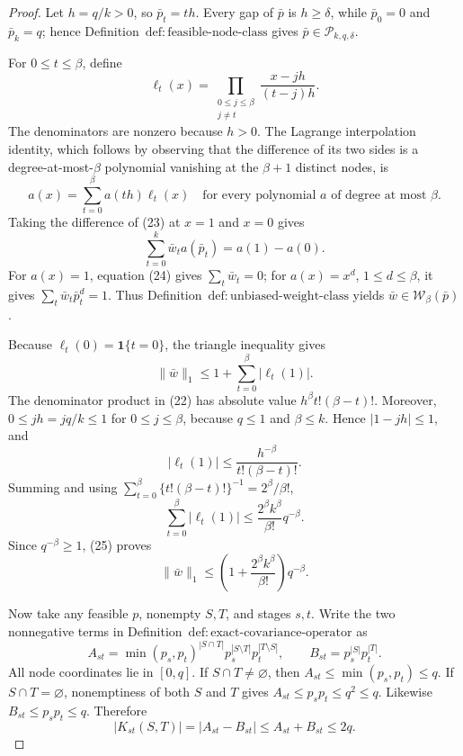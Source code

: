 \documentclass{article}
\begin{document}
\begin{proof}
Let \(h=q/k>0\), so \(\bar p_t=th\).  Every gap of \(\bar p\) is \(h\ge\delta\), while \(\bar p_0=0\) and \(\bar p_k=q\); hence Definition~\(\mathrm{def{:}feasible\text{-}node\text{-}class}\) gives \(\bar p\in\mathcal P_{k,q,\delta}\).

For \(0\le t\le\beta\), define
\[
\ell_t(x)=\prod_{\substack{0\le j\le\beta\\j\ne t}}
\frac{x-jh}{(t-j)h}.
\tag{22}
\]
The denominators are nonzero because \(h>0\).  The Lagrange interpolation identity, which follows by observing that the difference of its two sides is a degree-at-most-\(\beta\) polynomial vanishing at the \(\beta+1\) distinct nodes, is
\[
a(x)=\sum_{t=0}^\beta a(th)\ell_t(x)
\quad\text{for every polynomial \(a\) of degree at most \(\beta\)}.
\tag{23}
\]
Taking the difference of (23) at \(x=1\) and \(x=0\) gives
\[
\sum_{t=0}^k\bar w_ta(\bar p_t)=a(1)-a(0).
\tag{24}
\]
For \(a(x)=1\), equation (24) gives \(\sum_t\bar w_t=0\); for \(a(x)=x^d\), \(1\le d\le\beta\), it gives \(\sum_t\bar w_t\bar p_t^d=1\).  Thus Definition~\(\mathrm{def{:}unbiased\text{-}weight\text{-}class}\) yields \(\bar w\in\mathcal W_\beta(\bar p)\).

Because \(\ell_t(0)=\mathbf 1\{t=0\}\), the triangle inequality gives
\[
\|\bar w\|_1
\le1+\sum_{t=0}^\beta|\ell_t(1)|.
\tag{25}
\]
The denominator product in (22) has absolute value \(h^\beta t!(\beta-t)!\).  Moreover, \(0\le jh=jq/k\le1\) for \(0\le j\le\beta\), because \(q\le1\) and \(\beta\le k\).  Hence \(|1-jh|\le1\), and
\[
|\ell_t(1)|
\le\frac{h^{-\beta}}{t!(\beta-t)!}.
\]
Summing and using \(\sum_{t=0}^\beta\{t!(\beta-t)!\}^{-1}=2^\beta/\beta!\),
\[
\sum_{t=0}^\beta|\ell_t(1)|
\le\frac{2^\beta k^\beta}{\beta!}q^{-\beta}.
\]
Since \(q^{-\beta}\ge1\), (25) proves
\[
\|\bar w\|_1
\le\left(1+\frac{2^\beta k^\beta}{\beta!}\right)q^{-\beta}.
\tag{26}
\]

Now take any feasible \(p\), nonempty \(S,T\), and stages \(s,t\).  Write the two nonnegative terms in Definition~\(\mathrm{def{:}exact\text{-}covariance\text{-}operator}\) as
\[
A_{st}=\min(p_s,p_t)^{|S\cap T|}p_s^{|S\setminus T|}p_t^{|T\setminus S|},
\qquad
B_{st}=p_s^{|S|}p_t^{|T|}.
\]
All node coordinates lie in \([0,q]\).  If \(S\cap T\ne\varnothing\), then \(A_{st}\le\min(p_s,p_t)\le q\).  If \(S\cap T=\varnothing\), nonemptiness of both \(S\) and \(T\) gives \(A_{st}\le p_sp_t\le q^2\le q\).  Likewise \(B_{st}\le p_sp_t\le q\).  Therefore
\[
|K_{st}(S,T)|=|A_{st}-B_{st}|
\le A_{st}+B_{st}\le2q.
\tag{27}
\]


\end{proof}
\end{document}
